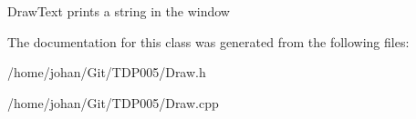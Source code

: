 \-Draw\-Text prints a string in the window 

\-The documentation for this class was generated from the following files\-:\begin{DoxyCompactItemize}
\item 
/home/johan/\-Git/\-T\-D\-P005/\-Draw.\-h\item 
/home/johan/\-Git/\-T\-D\-P005/\-Draw.\-cpp\end{DoxyCompactItemize}
